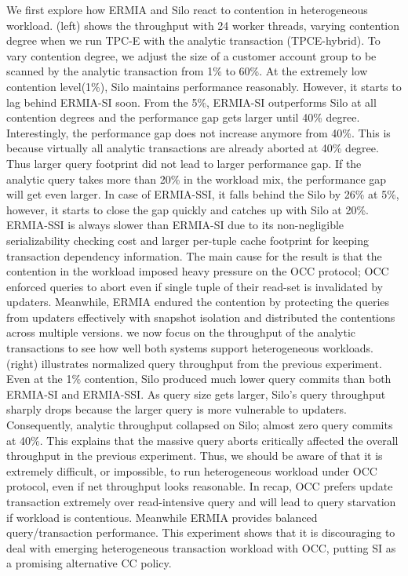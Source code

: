 We first explore how ERMIA and Silo react to contention in heterogeneous workload.  (left) shows the throughput with 24 worker threads, varying contention degree when we run TPC-E with the analytic transaction (TPCE-hybrid). To vary contention degree, we adjust the size of a customer account group to be scanned by the analytic transaction from 1\% to 60\%. At the extremely low contention level(1\%), Silo maintains performance reasonably. However, it starts to lag behind ERMIA-SI soon. From the 5\%,  ERMIA-SI outperforms Silo at all contention degrees and the performance gap gets larger until 40\% degree. Interestingly, the performance gap does not increase anymore from 40\%. This is because virtually all analytic transactions are already aborted at 40\% degree. Thus larger query footprint did not lead to larger performance gap. If the analytic query takes more than 20\% in the workload mix, the performance gap will get even larger. In case of ERMIA-SSI, it falls behind the Silo by 26\% at 5\%, however, it starts to close the gap quickly and catches up with Silo at 20\%. ERMIA-SSI is always slower than ERMIA-SI due to its non-negligible serializability checking cost and larger per-tuple cache footprint for keeping transaction dependency information. 
The main cause for the result is that the contention in the workload imposed heavy pressure on the OCC protocol; OCC enforced queries to abort even if single tuple of their read-set is invalidated by updaters. Meanwhile, ERMIA endured the contention by protecting the queries from updaters effectively with snapshot isolation and distributed the contentions across multiple versions. 
we now focus on the throughput of the analytic transactions to see how well both systems support heterogeneous workloads.  (right) illustrates normalized query throughput from the previous experiment. Even at the 1\% contention, Silo produced much lower query commits than both ERMIA-SI and ERMIA-SSI. As query size gets larger, Silo's query throughput sharply drops because the larger query is  more vulnerable to updaters. Consequently, analytic throughput collapsed on Silo; almost zero query commits at 40\%. This explains that the massive query aborts critically affected the overall throughput in the previous experiment. Thus, we should be aware of that it is extremely difficult, or impossible, to run heterogeneous workload under OCC protocol, even if net throughput looks reasonable. In recap, OCC prefers update transaction extremely over read-intensive query and will lead to query starvation if workload is contentious. Meanwhile ERMIA provides balanced query/transaction performance. This experiment shows that it is discouraging to deal with emerging heterogeneous transaction workload with OCC, putting SI as a promising alternative CC policy.  

